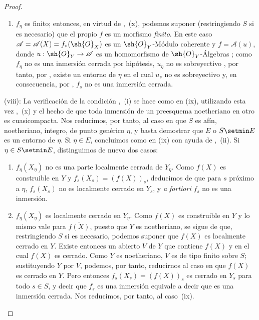 \begin{proof}
\begin{enumerate}[label=\upshape{$\arabic{enumi}^\circ$}]
  \item $f_\eta$ es finito; entonces, en virtud de ,~(x), podemos suponer (restringiendo $S$ si es necesario) que el propio $f$ es un morfismo \emph{finito}.
  En este caso $\mathscr{A}=\mathscr{A}(X)=f_*(\sh{O}_X)$ es un $\sh{O}_Y$-Módulo coherente  y $f=\mathscr{A}(u)$, donde $u:\sh{O}_Y\to\mathscr{A}$ es un homomorfismo de $\sh{O}_Y$-Álgebras ; como $f_\eta$ no es una inmersión cerrada por hipótesis, $u_\eta$ no es sobreyectivo , por tanto, por , existe un entorno de $\eta$ en el cual $u_s$ no es sobreyectivo y, en consecuencia, por , $f_s$ no es una inmersión cerrada.
\end{enumerate}

(viii): La verificación de la condición ,~(i) se hace como en (ix), utilizando esta vez ,~(x) y el hecho de que toda inmersión de un preesquema noetheriano en otro es cuasicompacta.
Nos reducimos, por tanto, al caso en que $S$ es afín, noetheriano, íntegro, de punto genérico $\eta$, y basta demostrar que $E$ o $S\setmin E$ es un entorno de $\eta$.
Si $\eta\in E$, concluimos como en (ix) con ayuda de ,~(ii).
Si $\eta\in S\setmin E$, distinguimos de nuevo dos casos:
\begin{enumerate}[label=\upshape{$\arabic{enumi}^\circ$}]
  \item $f_\eta(X_\eta)$ no es una parte localmente cerrada de $Y_\eta$.
  Como $f(X)$ es construible en $Y$  y $f_s(X_s)=(f(X))_s$, deducimos de  que para $s$ próximo a $\eta$, $f_s(X_s)$ no es localmente cerrado en $Y_s$, y \emph{a fortiori} $f_s$ no es una inmersión.

  \item{} $f_\eta(X_\eta)$ es localmente cerrado en $Y_\eta$.
  Como $f(X)$ es construible en $Y$  y lo mismo vale para $\overline{f(X)}$, puesto que $Y$ es noetheriano, se sigue de  que, restringiendo $S$ si es necesario, podemos suponer que $f(X)$ es localmente cerrado en $Y$.
  Existe entonces un abierto $V$ de $Y$ que contiene $f(X)$ y en el cual $f(X)$ es cerrado.
  Como $Y$ es noetheriano, $V$ es de tipo finito sobre $S$; sustituyendo $Y$ por $V$, podemos, por tanto, reducirnos al caso en que $f(X)$ es cerrado en $Y$.
  Pero entonces $f_s(X_s)=(f(X))_s$ es cerrado en $Y_s$ para todo $s\in S$, y decir que $f_s$ es una inmersión equivale a decir que es una inmersión cerrada.
  Nos reducimos, por tanto, al caso~(ix).
\end{enumerate}


\end{proof}

